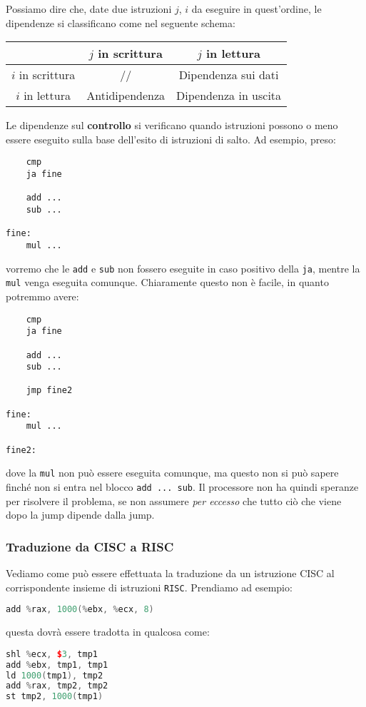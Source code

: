 \documentclass[a4paper,11pt]{article}
\begin{document}
Possiamo dire che, date due istruzioni $j$, $i$ da eseguire in quest'ordine, le dipendenze si classificano come nel seguente schema:

\begin{table}[h!]
	\center
	\begin{tabular} { c | c  c  }
		& $j$ in scrittura & $j$ in lettura \\ 
		\hline
		$i$ in scrittura & // & Dipendenza sui dati \\ 
		$i$ in lettura & Antidipendenza & Dipendenza in uscita
	\end{tabular}
\end{table}

Le dipendenze sul \textbf{controllo} si verificano quando istruzioni possono o meno essere eseguito sulla base dell'esito di istruzioni di salto.
Ad esempio, preso:
\begin{lstlisting}	
	cmp
	ja fine

	add ...
	sub ...

fine:
	mul ...
\end{lstlisting}
vorremo che le \lstinline|add| e \lstinline|sub| non fossero eseguite in caso positivo della \lstinline|ja|, mentre la \lstinline|mul| venga eseguita comunque.
Chiaramente questo non è facile, in quanto potremmo avere:
\begin{lstlisting}	
	cmp
	ja fine

	add ...
	sub ...

	jmp fine2

fine:
	mul ...

fine2:
\end{lstlisting}
dove la \lstinline|mul| non può essere eseguita comunque, ma questo non si può sapere finché non si entra nel blocco \lstinline|add ... sub|.
Il processore non ha quindi speranze per risolvere il problema, se non assumere \textit{per eccesso} che tutto ciò che viene dopo la jump dipende dalla jump. 

\subsubsection{Traduzione da CISC a RISC}
Vediamo come può essere effettuata la traduzione da un istruzione CISC al corrispondente insieme di istruzioni \lstinline|RISC|.
Prendiamo ad esempio:
\begin{lstlisting}[language=C++, style=codestyle]	
add %rax, 1000(%ebx, %ecx, 8)
\end{lstlisting}
questa dovrà essere tradotta in qualcosa come:
\begin{lstlisting}[language=C++, style=codestyle]	
shl %ecx, $3, tmp1
add %ebx, tmp1, tmp1
ld 1000(tmp1), tmp2
add %rax, tmp2, tmp2
st tmp2, 1000(tmp1)
\end{lstlisting}
\end{document}
